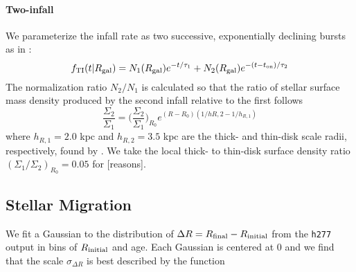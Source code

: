 \documentclass[twocolumn,linenumbers,twocolappendix]{aastex631}
\begin{document}
\paragraph{Two-infall} 
We parameterize the infall rate as two successive, exponentially declining bursts as in \citet{Chiappini2001-AbundanceGradients}:
\begin{equation}
    \label{eq:twoinfall-ifr}
    f_{\rm TI}(t|R_{\rm gal}) = N_1(R_{\rm gal}) e^{-t/\tau_1} + N_2(R_{\rm gal}) e^{-(t-t_{\rm on})/\tau_2}
\end{equation}
The normalization ratio $N_2/N_1$ is calculated so that the ratio of stellar surface mass density produced by the second infall relative to the first follows
\begin{equation}
    \frac{\Sigma_2}{\Sigma_1} = \Big(\frac{\Sigma_2}{\Sigma_1}\Big)_{R_0} e^{(R-R_0)(1/h{R,2} - 1/h_{R,1})}
\end{equation}
where $h_{R,1}=2.0$ kpc and $h_{R,2}=3.5$ kpc are the thick- and thin-disk scale radii, respectively, found by \citet{Bovy2012-SubPopulationStructure}. We take the local thick- to thin-disk surface density ratio $(\Sigma_1/\Sigma_2)_{R_0}=0.05$ for [reasons].

\subsection{Stellar Migration}
\label{sec:migration}

\citet{Johnson2021-Migration}

We fit a Gaussian to the distribution of $\Delta R = R_{\rm final} - R_{\rm initial}$ from the \texttt{h277} output in bins of $R_{\rm initial}$ and age. Each Gaussian is centered at 0 and we find that the scale $\sigma_{\Delta R}$ is best described by the function
\end{document}
